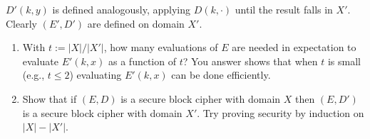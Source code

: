 $D'(k, y)$ is defined analogously, applying $D(k, ·)$ until the result falls in $X'$. Clearly $(E', D')$ are defined on domain $X'$.

\begin{enumerate}
    \item With $t := |X|/|X'|$, how many evaluations of $E$ are needed in expectation to evaluate $E'(k, x)$ as a function of $t$? You answer shows that when $t$ is small (e.g., $t \leq 2$) evaluating $E'(k, x)$ can be done efficiently.
    
    \item Show that if $(E,D)$ is a secure block cipher with domain $X$ then $(E, D')$ is a secure block cipher with domain $X'$. Try proving security by induction on $|X |-|X'|$.
\end{enumerate}
